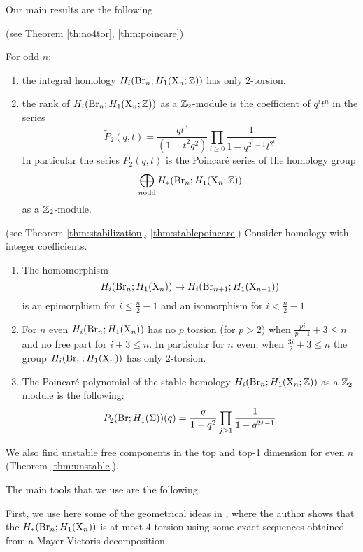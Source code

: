 Our main results are the following 

\begin{thm} (see Theorem \ref{th:no4tor}, \ref{thm:poincare})

For odd $n:$
\begin{enumerate}
\item  the integral homology $H_{i}(\operatorname{Br}_n; H_1(\mathrm{X}_n;\mathbb{Z}))$ has only $2$-torsion. 
\item the rank of $H_i(\operatorname{Br}_n;H_1(\mathrm{X}_n;\mathbb{Z}))$ as a $\mathbb{Z}_2$-module is the coefficient of $q^it^n$ in the series
 $$
\widetilde{P}_2(q,t)=\frac{qt^3}{(1-t^2q^2)} \prod_{i \geq 0} \frac{1}{1-q^{2^i-1}t^{2^i}}
$$
In particular the series $\widetilde{P}_2(q,t)$ is 
the Poincar\'e series of the homology group  %
$$\bigoplus_{n \mbox{\scriptsize odd}}H_*(\operatorname{Br}_{n};H_1(\mathrm{X}_n;\mathbb{Z}))$$
as a $\mathbb{Z}_2$-module. 
\end{enumerate}
\end{thm}

\begin{thm} (see Theorem \ref{thm:stabilization}, \ref{thm:stablepoincare})
Consider homology with integer coefficients. 
\begin{enumerate}
\item The homomorphism 
$$
H_i(\operatorname{Br}_n; H_1(\mathrm{X}_n)) \to H_i(\operatorname{Br}_{n+1}; H_1(\mathrm{X}_{n+1}))
$$
is an epimorphism for $i \leq \frac{n}{2}-1 $
and an isomorphism for $i < \frac{n}{2}-1$.

\item For $n$ even $H_i(\operatorname{Br}_n; H_1(\mathrm{X}_n))$ has no $p$ torsion (for $p > 2$) when $\frac{pi}{p-1}+3 \leq n$ and no free part for $i+3 \leq n$. In particular for $n$ even,  when $\frac{3i}{2}+3 \leq n$ the group $H_i(\operatorname{Br}_n; H_1(\mathrm{X}_n))$ has only $2$-torsion.
\item 
The Poincar\'e polynomial of the stable homology $H_i(\operatorname{Br}_n;H_1(\mathrm{X}_n;\mathbb{Z}))$ as a $\mathbb{Z}_2$-module is the following:
$$
P_2(\operatorname{Br};H_1(\Sigma))(q) = \frac{q}{1-q^2} \prod_{j \geq 1} \frac{1}{1-q^{2^j-1}}
$$
\end{enumerate}
\end{thm}

We also find unstable free components in the top and top-1 dimension for even $n$ (Theorem \ref{thm:unstable}). 

The main tools that we use are the following. 

First, we use here some of the geometrical ideas in \cite{bianchi}, where  the author shows that the $H_*(\operatorname{Br}_n;H_1(\mathrm{X}_n))$ is at most $4$-torsion using some exact sequences obtained from a Mayer-Vietoris decomposition. 


